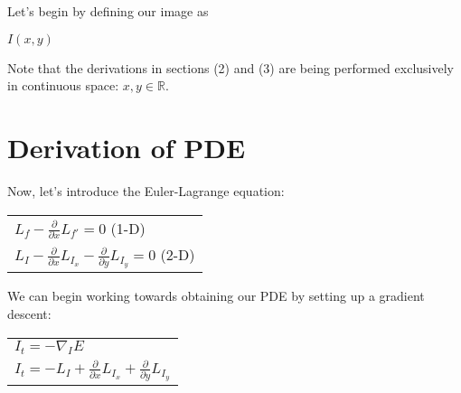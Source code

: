 \documentclass{article}
\begin{document}
  \noindent
  Let's begin by defining our image as
    \begin{center}
      $I(x,y)$
    \end{center}
  Note that the derivations in sections (2) and (3) are being performed
  exclusively in continuous space: $x,y \in \mathbb{R}$.
  \\
  
  \newpage
  \noindent






  \newpage
  \section{Derivation of PDE}

    \noindent Now, let's introduce the Euler-Lagrange equation:
      \begin{center}
        \begin{tabular}{l}
        $L_{f} - \frac{\partial}{\partial x}L_{f'} = 0$ (1-D)\\
        $L_{I} - \frac{\partial}{\partial x}L_{I_{x}} - \frac{\partial}{\partial y}L_{I_{y}} = 0$ (2-D)\\
        \end{tabular}
      \end{center}

    \noindent
    We can begin working towards obtaining our PDE by setting up a gradient descent:
      \begin{center}
        \begin{tabular}{l}
          $I_{t} = -\nabla_{I}E$\\
          $I_{t} = -L_{I} + \frac{\partial}{\partial x}L_{I_{x}} + \frac{\partial}{\partial y}L_{I_{y}}$
        \end{tabular}
      \end{center}
\end{document}
